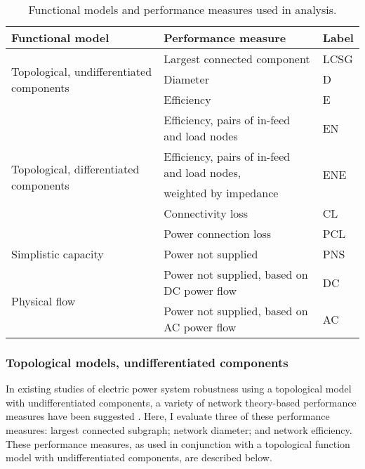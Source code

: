 \begin{table}
\centering
\scriptsize

\begin{tabular}{l l l}
\toprule
\textbf{Functional model} & \textbf{Performance measure} & \textbf{Label}\\
\midrule
\multirow{3}{*}{Topological, undifferentiated components} & Largest connected component & LCSG\\
 & Diameter & D \\
 & Efficiency & E \\
\hline
\multirow{5}{*}{Topological, differentiated components} & Efficiency, pairs of in-feed and load nodes & EN\\
 & Efficiency, pairs of in-feed and load nodes, & \multirow{2}{*}{ENE} \\
 & weighted by impedance &  \\
 & Connectivity loss & CL \\
 & Power connection loss & PCL \\
\hline
Simplistic capacity & Power not supplied & PNS \\
\hline
\multirow{2}{*}{Physical flow } & Power not supplied, based on DC power flow & DC \\
 & Power not supplied, based on AC power flow & AC \\
\bottomrule
\end{tabular}

\caption{\label{tab:ch3:funcmodel}Functional models and performance measures used in analysis.}

\end{table}



\subsubsection{Topological models, undifferentiated components}
\label{ssec:methods:models:undiftopo}

In existing studies of electric power system robustness using a topological model with undifferentiated components, a variety of network theory-based performance measures have been suggested \cite{Albert2004, Holmgren2006a, Rosas-Casals2007, Sole2008, Arianos2009, Winkler2010, Hines2011}.  Here, I evaluate three of these performance measures: largest connected subgraph; network diameter; and network efficiency.  These performance measures, as used in conjunction with a topological function model with undifferentiated components, are described below.

